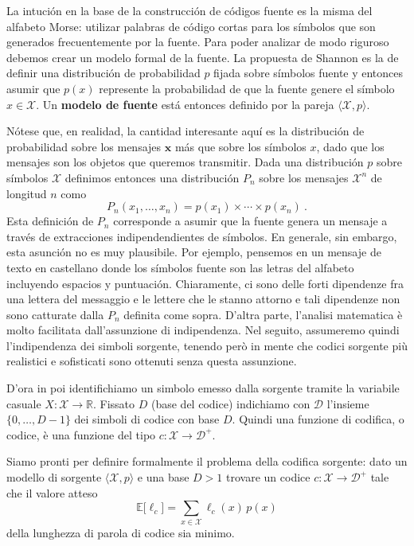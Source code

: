 \documentclass[11pt]{article}
\newcommand{\bx}{ \boldsymbol{x} }
\newcommand{\scD}{\mathcal{D}}
\newcommand{\scX}{\mathcal{X}}
\newcommand{\field}[1]{\mathbb{#1}}
\newcommand{\R}{\field{R}}
\newcommand{\E}{\field{E}}
\begin{document}
La intución en la base de la construcción de códigos fuente es la misma del alfabeto Morse: utilizar palabras de código cortas para los símbolos que son generados frecuentemente por la fuente. Para poder analizar de modo riguroso debemos crear un modelo formal de la fuente. La propuesta de Shannon es la de definir una distribución de probabilidad $p$ fijada sobre símbolos fuente y entonces asumir que $p(x)$ represente la probabilidad de que la fuente genere el símbolo $x\in\scX$. Un \textbf{modelo de fuente} está entonces definido por la pareja $\langle\scX,p\rangle$.

Nótese que, en realidad, la cantidad interesante aquí es la distribución de probabilidad sobre los mensajes $\bx$ más que sobre los símbolos $x$, dado que los mensajes son los objetos que queremos transmitir. Dada una distribución $p$ sobre símbolos $\scX$ definimos entonces una distribución $P_n$ sobre los mensajes $\scX^n$ de longitud $n$ como
\[
    P_n(x_1,\dots,x_n) = p(x_1) \times\cdots\times p(x_n)~.
\]
Esta definición de $P_n$ corresponde a asumir que la fuente genera un mensaje a través de extracciones indipendendientes de símbolos. En generale, sin embargo, esta asunción no es muy plausibile. Por ejemplo, pensemos en un mensaje de texto en castellano donde los símbolos fuente son las letras del alfabeto incluyendo espacios y puntuación. Chiaramente, ci sono delle forti dipendenze fra una lettera del messaggio e le lettere che le stanno attorno e tali dipendenze non sono catturate dalla $P_n$ definita come sopra. D'altra parte, l'analisi matematica è molto facilitata dall'assunzione di indipendenza. Nel seguito, assumeremo quindi l'indipendenza dei simboli sorgente, tenendo però in mente che codici sorgente più realistici e sofisticati sono ottenuti senza questa assunzione.

D'ora in poi identifichiamo un simbolo emesso dalla sorgente tramite la variabile casuale $X : \scX\to\R$.
Fissato $D$ (base del codice) indichiamo con $\scD$ l'insieme $\{0,\dots,D-1\}$ dei simboli di codice con base $D$. Quindi una funzione di codifica, o codice, è una funzione del tipo $c : \scX\to\scD^+$.

Siamo pronti per definire formalmente il problema della codifica sorgente: dato un modello di sorgente $\langle\scX,p\rangle$ e una base $D > 1$ trovare un codice $c : \scX\to\scD^+$ tale che il valore atteso
\begin{equation}
\label{eq:source-coding}
    \E\bigl[\ell_c\bigr] = \sum_{x\in\scX} \ell_c(x)\,p(x)
\end{equation}
della lunghezza di parola di codice sia minimo.
\end{document}
